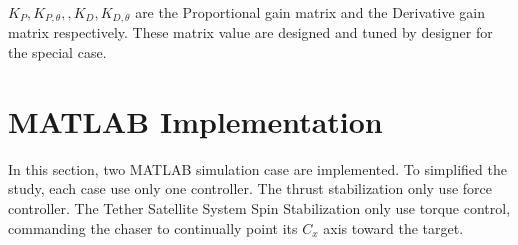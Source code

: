 $K_P,K_{P,\theta},, K_D,K_{D,\theta}$ are the Proportional gain matrix and the Derivative gain matrix respectively. These matrix value are designed and tuned by designer for the special case.

\section{MATLAB Implementation}
In this section, two MATLAB simulation case are implemented. To simplified the study, each case use only one controller. The thrust stabilization only use force controller. The Tether Satellite System Spin Stabilization only use torque control, commanding the chaser to continually point its $C_x$  axis toward the target. 


\newpage
